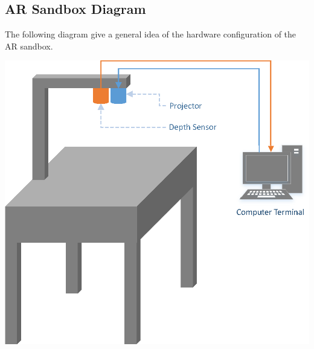 \documentclass[onecolumn, draftclsnofoot,10pt, compsoc]{IEEEtran}
\begin{document}
\begin{appendices}
\pagebreak

\section{AR Sandbox Diagram}
The following diagram give a general idea of the hardware configuration of the AR sandbox.
\begin{center}
\includegraphics[width=6in]{Diagram}
\end{center}

\end{appendices}
\end{document}
